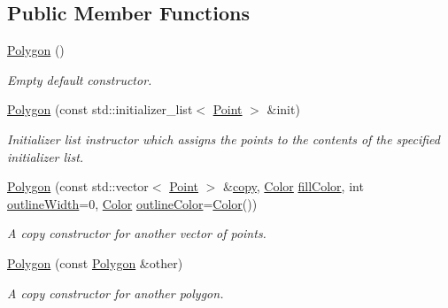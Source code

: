\subsection*{Public Member Functions}
\begin{DoxyCompactItemize}
\item 
\mbox{\label{classcturtle_1_1Polygon_a082dfb4e86877ccef9f20e1b1410fdde}} 
\hyperlink{classcturtle_1_1Polygon_a082dfb4e86877ccef9f20e1b1410fdde}{Polygon} ()
\begin{DoxyCompactList}\small\item\em Empty default constructor. \end{DoxyCompactList}\item 
\hyperlink{classcturtle_1_1Polygon_a035f78fca7139d12bc9626105bc326e3}{Polygon} (const std\+::initializer\+\_\+list$<$ \hyperlink{structcturtle_1_1ivec2}{Point} $>$ \&init)
\begin{DoxyCompactList}\small\item\em Initializer list instructor which assigns the points to the contents of the specified initializer list. \end{DoxyCompactList}\item 
\hyperlink{classcturtle_1_1Polygon_ab0832036c581dcf59a156527187eb033}{Polygon} (const std\+::vector$<$ \hyperlink{structcturtle_1_1ivec2}{Point} $>$ \&\hyperlink{classcturtle_1_1Polygon_ad03f061d4f109125994b8613ccb3864a}{copy}, \hyperlink{classcturtle_1_1Color}{Color} \hyperlink{classcturtle_1_1AbstractDrawableObject_a37d635a02ad3e5206a6eb99b7b5f1963}{fill\+Color}, int \hyperlink{classcturtle_1_1AbstractDrawableObject_aeffaecc245057e9a42e5688671a77f52}{outline\+Width}=0, \hyperlink{classcturtle_1_1Color}{Color} \hyperlink{classcturtle_1_1AbstractDrawableObject_abd04640855e7623bb84b52babd8b32b6}{outline\+Color}=\hyperlink{classcturtle_1_1Color}{Color}())
\begin{DoxyCompactList}\small\item\em A copy constructor for another vector of points. \end{DoxyCompactList}\item 
\hyperlink{classcturtle_1_1Polygon_a2f87d81daf3a02a53d2db818b74b6006}{Polygon} (const \hyperlink{classcturtle_1_1Polygon}{Polygon} \&other)
\begin{DoxyCompactList}\small\item\em A copy constructor for another polygon. \end{DoxyCompactList}\item 

\end{DoxyCompactItemize}
